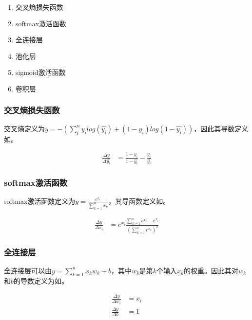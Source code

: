 \begin{enumerate}
\item 交叉熵损失函数
\item softmax激活函数
\item 全连接层
\item 池化层
\item sigmoid激活函数
\item 卷积层
\end{enumerate}

\subsubsection{交叉熵损失函数}

交叉熵定义为$y=-(\sum_{i}^{n}{y_i log(\hat{y_i}) + (1-y_i)log(1-\hat{y_i})})$，因此其导数定义如。

\begin{equation}\label{eq:CELF}
\begin{aligned}
\frac{\Delta y}{\Delta \hat{y_i}} &= \frac{1-y_i}{1-\hat{y_i}} - \frac{y_i}{\hat{y_i}}
\end{aligned}
\end{equation}

\subsubsection{softmax激活函数}

softmax激活函数定义为$y = \frac{e^{x_i}}{\sum_{k=1}^{n}{x_k}}$，其导函数定义如。

\begin{equation}\label{eq:softmax-bp}
\begin{aligned}
\frac{\Delta y}{\Delta x_i} &= e^{x_i} \frac{\sum_{k=1}^{n}{e^{x_k}} - e^{x_i}}{(\sum_{k=1}^{n}{e^{x_k}})^2}
\end{aligned}
\end{equation}

\subsubsection{全连接层}

全连接层可以由$y=\sum_{k=1}^{n}{x_k w_k} + b$，其中$w_k$是第$k$个输入$x_k$的权重。因此其对$w_k$和$b$的导数定义为如。

\begin{equation}\label{eq:affine-bp}
\begin{aligned}
\frac{\Delta y}{\Delta w_i} &= x_i \\
\frac{\Delta y}{\Delta b} &= 1
\end{aligned}
\end{equation}

